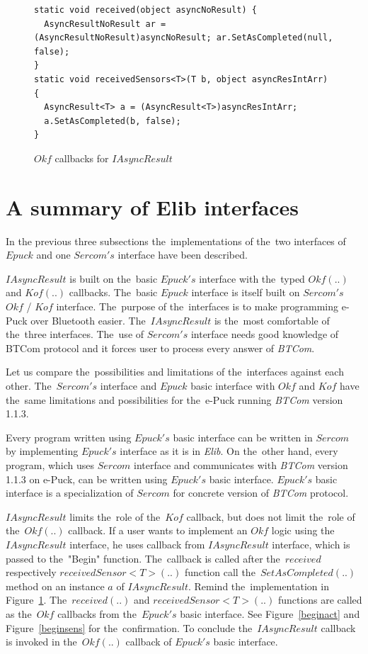 \begin{figure}[!hbp]
\begin{lstlisting}
static void received(object asyncNoResult) {
  AsyncResultNoResult ar = (AsyncResultNoResult)asyncNoResult; ar.SetAsCompleted(null, false); 
}
static void receivedSensors<T>(T b, object asyncResIntArr) {
  AsyncResult<T> a = (AsyncResult<T>)asyncResIntArr;
  a.SetAsCompleted(b, false);
}
\end{lstlisting}	
\caption{$Okf$ callbacks for $IAsyncResult$} \label{Iokfs}
\end{figure}

\section{A summary of Elib interfaces}
\label{sec:suminterface}
  In the previous three subsections the~implementations of the~two interfaces of $Epuck$ 
  and one $Sercom's$ interface have been described.

  $IAsyncResult$ is built on the~basic $Epuck's$ interface with the~typed $Okf(..)$ and $Kof(..)$ callbacks. 
  The~basic $Epuck$ interface is itself built on $Sercom's$ $Okf$ / $Kof$ interface.
  The~purpose of the~interfaces is to make programming e-Puck over Bluetooth easier.
  The~$IAsyncResult$ is the~most comfortable of the~three interfaces. 
  The~use of $Sercom's$ interface needs good knowledge of BTCom protocol and 
  it forces user to process every answer of {\it BTCom}.

  Let us compare the~possibilities and limitations of the~interfaces against each other.
  The~$Sercom's$ interface and $Epuck$ basic interface with $Okf$ and $Kof$ 
  have the~same limitations and possibilities for the~e-Puck running {\it BTCom} version 1.1.3. 
  
  Every program written using $Epuck's$ basic interface can be written
  in $Sercom$ by implementing $Epuck's$ interface as it is in {\it Elib}.
  On the~other hand, every program, which uses $Sercom$ interface and communicates with {\it BTCom}
  version 1.1.3 on e-Puck, can be written using $Epuck's$ basic interface. 
  $Epuck's$ basic interface is a specialization of $Sercom$ for concrete version of {\it BTCom}
  protocol.

  $IAsyncResult$ limits the~role of the~$Kof$ callback, but does not limit the~role of the~$Okf(..)$ callback.
  If a user wants to implement an $Okf$ logic using the~$IAsyncResult$ interface, he uses callback from $IAsyncResult$
  interface, which is passed to the~"Begin" function.
  The~callback is called after the~$received$ respectively $receivedSensor<T>(..)$ function  call 
  the~$SetAsCompleted(..)$ method on an instance $a$ of $IAsyncResult$. 
  Remind the~implementation in Figure~\ref{Iokfs}.
  The~$received(..)$ and $receivedSensor<T>(..)$ functions are called as the~$Okf$ callbacks
  from the~$Epuck's$ basic interface.
  See Figure~\ref{beginact} and Figure~\ref{beginsens} for the~confirmation.
  To conclude the~$IAsyncResult$ callback is invoked in the~$Okf(..)$ callback of $Epuck's$ basic interface.

